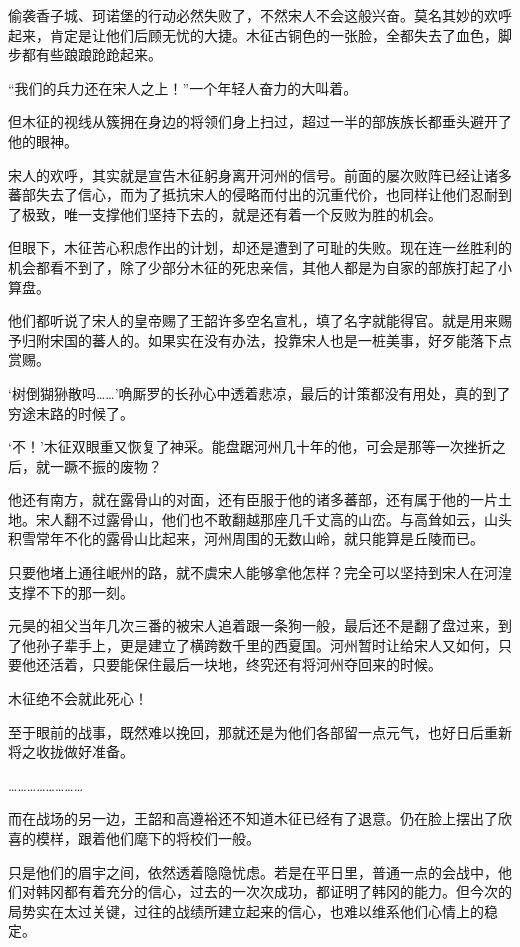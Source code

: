 偷袭香子城、珂诺堡的行动必然失败了，不然宋人不会这般兴奋。莫名其妙的欢呼起来，肯定是让他们后顾无忧的大捷。木征古铜色的一张脸，全都失去了血色，脚步都有些踉踉跄跄起来。

“我们的兵力还在宋人之上！”一个年轻人奋力的大叫着。

但木征的视线从簇拥在身边的将领们身上扫过，超过一半的部族族长都垂头避开了他的眼神。

宋人的欢呼，其实就是宣告木征躬身离开河州的信号。前面的屡次败阵已经让诸多蕃部失去了信心，而为了抵抗宋人的侵略而付出的沉重代价，也同样让他们忍耐到了极致，唯一支撑他们坚持下去的，就是还有着一个反败为胜的机会。

但眼下，木征苦心积虑作出的计划，却还是遭到了可耻的失败。现在连一丝胜利的机会都看不到了，除了少部分木征的死忠亲信，其他人都是为自家的部族打起了小算盘。

他们都听说了宋人的皇帝赐了王韶许多空名宣札，填了名字就能得官。就是用来赐予归附宋国的蕃人的。如果实在没有办法，投靠宋人也是一桩美事，好歹能落下点赏赐。

‘树倒猢狲散吗……’唃厮罗的长孙心中透着悲凉，最后的计策都没有用处，真的到了穷途末路的时候了。

‘不！’木征双眼重又恢复了神采。能盘踞河州几十年的他，可会是那等一次挫折之后，就一蹶不振的废物？

他还有南方，就在露骨山的对面，还有臣服于他的诸多蕃部，还有属于他的一片土地。宋人翻不过露骨山，他们也不敢翻越那座几千丈高的山峦。与高耸如云，山头积雪常年不化的露骨山比起来，河州周围的无数山岭，就只能算是丘陵而已。

只要他堵上通往岷州的路，就不虞宋人能够拿他怎样？完全可以坚持到宋人在河湟支撑不下的那一刻。

元昊的祖父当年几次三番的被宋人追着跟一条狗一般，最后还不是翻了盘过来，到了他孙子辈手上，更是建立了横跨数千里的西夏国。河州暂时让给宋人又如何，只要他还活着，只要能保住最后一块地，终究还有将河州夺回来的时候。

木征绝不会就此死心！

至于眼前的战事，既然难以挽回，那就还是为他们各部留一点元气，也好日后重新将之收拢做好准备。

……………………

而在战场的另一边，王韶和高遵裕还不知道木征已经有了退意。仍在脸上摆出了欣喜的模样，跟着他们麾下的将校们一般。

只是他们的眉宇之间，依然透着隐隐忧虑。若是在平日里，普通一点的会战中，他们对韩冈都有着充分的信心，过去的一次次成功，都证明了韩冈的能力。但今次的局势实在太过关键，过往的战绩所建立起来的信心，也难以维系他们心情上的稳定。

